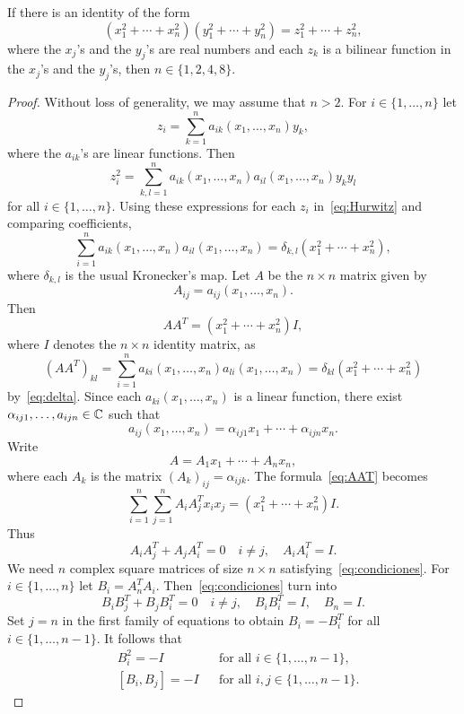 \begin{theorem}[Hurwitz]
    \label{thm:Hurwitz}
	If there is an identity of the form 
	\begin{equation}
		\label{eq:Hurwitz}
		(x_1^2+\cdots+x_n^2)(y_1^2+\cdots+y_n^2)=z_1^2+\cdots+z_n^2,
	\end{equation}
	where the $x_j$'s and the $y_j$'s are real numbers and
	each $z_k$ is a bilinear function in the $x_j$'s and the $y_j$'s, then 
	$n\in\{1,2,4,8\}$.
\end{theorem}

\begin{proof}
    Without loss of generality, we may assume that $n>2$.  For 
	$i\in\{1,\dots,n\}$ let  
	\[
		z_i=\sum_{k=1}^n a_{ik}(x_1,\dots,x_n)y_k,
	\]
	where the $a_{ik}$'s are linear functions. Then 
	\[
		z_i^2=\sum_{k,l=1}^na_{ik}(x_1,\dots,x_n)a_{il}(x_1,\dots,x_n)y_ky_l
	\]
	for all $i\in\{1,\dots,n\}$. Using these expressions for each $z_i$
	in~\eqref{eq:Hurwitz} and comparing coefficients, 
	\begin{equation}
		\label{eq:delta}
		\sum_{i=1}^n a_{ik}(x_1,\dots,x_n)a_{il}(x_1,\dots,x_n)=\delta_{k,l}(x_1^2+\cdots+x_n^2),
	\end{equation}
	where $\delta_{k,l}$ is the usual Kronecker's map. Let 
	$A$ be the $n\times n$ matrix given by 
	\[
	A_{ij}=a_{ij}(x_1,\dots,x_n).
	\]
	Then 
	\begin{equation}
		\label{eq:AAT}
		AA^T=(x_1^2+\cdots+x_n^2)I,
	\end{equation}
	where $I$ denotes the $n\times n$ identity matrix, 
	as 
	\[
		(AA^T)_{kl}=\sum_{i=1}^na_{ki}(x_1,\dots,x_n)a_{li}(x_1,\dots,x_n)=\delta_{kl}(x_1^2+\cdots+x_n^2)
	\]
	by~\eqref{eq:delta}. Since each $a_{ki}(x_1,\dots,x_n)$ is a linear function, 
	there exist $\alpha_{ij1},\dots,a_{ijn}\in\mathbb{C}$ such that 
	\[
		a_{ij}(x_1,\dots,x_n)=\alpha_{ij1}x_1+\cdots+\alpha_{ijn}x_n.
	\]
	Write 
	\[
		A=A_1x_1+\cdots+A_nx_n,
	\]
	where each $A_k$ is the matrix $(A_k)_{ij}=\alpha_{ijk}$. 
	The formula~\eqref{eq:AAT} becomes
	\[
		\sum_{i=1}^n\sum_{j=1}^nA_iA_j^Tx_ix_j=(x_1^2+\cdots+x_n^2)I.
	\]
	Thus 
	\begin{equation}
		\label{eq:condiciones}
		A_iA_j^T+A_jA_i^T=0\quad i\ne j,\quad
		A_iA_i^T=I.
	\end{equation}
	We need $n$ complex square matrices of size $n\times n$
	satisfying~\eqref{eq:condiciones}. For $i\in\{1,\dots,n\}$ let  
	$B_i=A_n^TA_i$. Then~\eqref{eq:condiciones} turn into  
	\[
		B_iB_j^T+B_jB_i^T=0\quad i\ne j,\quad
		B_iB_i^T=I,\quad
		B_n=I.
	\]
	Set $j=n$ in the first family of equations to obtain $B_i=-B_i^T$ for all 
	$i\in\{1,\dots,n-1\}$. It follows that 
	\begin{equation}
	\label{eq:representation}
	\begin{aligned}
	    &B_i^2=-I && \text{for all $i\in\{1,\dots,n-1\}$},\\
	    &[B_i,B_j]=-I && \text{for all $i,j\in\{1,\dots,n-1\}$.}
	\end{aligned}
	\end{equation}
    

\end{proof}
